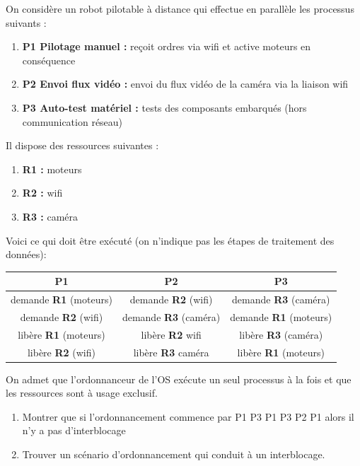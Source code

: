 \documentclass[a4paper,12pt,french]{book}
\begin{document}
\begin{exercice}[]
On considère un robot pilotable à distance qui effectue en parallèle les processus suivants :
\begin{enumerate}[--]
	\item 	\textbf{P1  Pilotage manuel : } reçoit ordres via wifi et active moteurs en conséquence
	\item 	\textbf{P2  Envoi flux vidéo : } envoi du flux vidéo de la caméra via la liaison wifi
    \item 	\textbf{P3  Auto-test matériel : } tests des composants embarqués (hors communication réseau)
\end{enumerate}
Il dispose des ressources suivantes :
\begin{enumerate}[--]
	\item 	\textbf{R1 : }  moteurs
	\item 	\textbf{R2 : }  wifi
    \item 	\textbf{R3 : }	caméra
\end{enumerate}
Voici ce qui doit être exécuté (on n'indique pas les étapes de traitement des données):

\begin{center}
\begin{tabular}{|c|c|c|}
\hline
\rowcolor{UGLiOrange} \textbf{\color{white}P1 }& \textbf{\color{white}P2} & \textbf{\color{white}P3} \\
\hline
demande \textbf{R1} (moteurs) & demande \textbf{R2} (wifi) & demande \textbf{R3} (caméra) \\
\hline
demande \textbf{R2} (wifi) & demande \textbf{R3} (caméra) &  demande \textbf{R1} (moteurs) \\
\hline
libère \textbf{R1} (moteurs) & libère \textbf{R2} wifi & libère \textbf{R3} (caméra)  \\
\hline
libère \textbf{R2} (wifi) & libère \textbf{R3} caméra & libère \textbf{R1} (moteurs)  \\
\hline
\end{tabular}
\end{center}
On admet que l'ordonnanceur de l'OS exécute un seul processus à la fois et que les ressources sont à usage exclusif.
\begin{enumerate}[\bfseries 1.]
	\item 	Montrer que si l'ordonnancement commence par  P1 P3 P1 P3 P2 P1 alors il n'y a pas d'interblocage
	\item 	Trouver un scénario d'ordonnancement qui conduit à un interblocage.
\end{enumerate}
\end{exercice}
\end{document}
